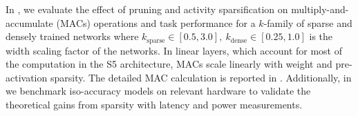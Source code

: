 





In , we evaluate the effect of pruning and activity sparsification on multiply-and-accumulate (MACs) operations and task performance for a $k$-family of sparse and densely trained networks where $k_\text{sparse} \in [0.5, 3.0], \ k_\text{dense} \in [0.25, 1.0]$ is the width scaling factor of the networks.
In linear layers, which account for most of the computation in the S5 architecture, MACs scale linearly with weight and pre-activation sparsity. The detailed MAC calculation is reported in .
Additionally, in  we benchmark iso-accuracy models on relevant hardware to validate the theoretical gains from sparsity with latency and power measurements.

